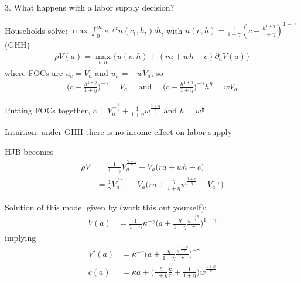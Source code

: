 \documentclass[11pt, aspectratio=169]{beamer}
\newenvironment{witemize}{\itemize\addtolength{\itemsep}{10pt}}{\enditemize}
\begin{document}
\begin{frame}{3. What happens with a labor supply decision?} 

\begin{witemize}
\item Households solve: $\max \int_0^\infty e^{- \rho t} u(c_t, h_t) dt$, with $u(c, h) = \frac{1}{1-\gamma} (c - \frac{h^{1+\eta}}{1+\eta})^{1-\gamma}$ (GHH)
\begin{align*}
	\rho V(a) = \max_{c, h} \Big\{ u(c, h) + (r a + w h - c) \partial_a V(a) \Big\}
\end{align*}
where FOCs are $u_c = V_a$ and $u_h = - w V_a$, so 
\begin{align*}
	\bigg( c - \frac{h^{1+\eta}}{1+\eta} \bigg)^{-\gamma} = V_a 
	\quad \text{ and } \quad
	\bigg( c - \frac{h^{1+\eta}}{1+\eta} \bigg)^{-\gamma} h^\eta = w V_a
\end{align*}

\item Putting FOCs together, $c = V_a^{- \frac{1}{\gamma}} + \frac{1}{1 + \eta} w^\frac{1+\eta}{\eta}$ and $h = w^\frac{1}{\eta}$

\item Intuition: under GHH there is no income effect on labor supply
\end{witemize}
\end{frame}


\begin{frame}{}
\begin{witemize}
\item HJB becomes
\begin{align*}
	\rho V &= \frac{1}{1-\gamma} V_a^\frac{\gamma-1}{\gamma} + V_a \Big( ra + w h - c \Big) \\
	&= \frac{1}{\gamma} V_a^\frac{\gamma-1}{\gamma} + V_a \bigg( ra + \frac{\eta}{1 + \eta} w^\frac{1+\eta}{\eta} - V_a^{- \frac{1}{\gamma}} \bigg)
\end{align*}

\item Solution of this model given by (work this out yourself):
\begin{align*}
	V(a) &= \frac{1}{1-\gamma} \kappa^{-\gamma} \bigg( a + \frac{\eta}{1+\eta} \frac{w^\frac{1+\eta}{\eta}}{r} \bigg)^{1-\gamma}
\end{align*}
implying
\begin{align*}
	V'(a) &= \kappa^{-\gamma} \bigg( a + \frac{\eta}{1+\eta} \frac{w^\frac{1+\eta}{\eta}}{r} \bigg)^{-\gamma} \\
	c(a) &= \kappa a + \bigg( \frac{\eta}{1+\eta} \frac{\tilde \kappa}{r} + \frac{1}{1+\eta} \bigg) w^\frac{1+\eta}{\eta}
\end{align*}
\end{witemize}
\end{frame}
\end{document}
